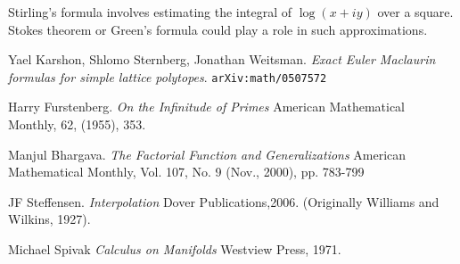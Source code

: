 \documentclass[12pt]{article}
\begin{document}
{\noindent Stirling's formula involves estimating the integral of $\log (x + iy)$ over a square.  Stokes theorem or Green's formula could play a role in such approximations.



\begin{thebibliography}{9}
Yael Karshon, Shlomo Sternberg, Jonathan Weitsman.
\textit{Exact Euler Maclaurin formulas for simple lattice polytopes}.  \texttt{arXiv:math/0507572}
 
Harry Furstenberg.  \textit{On the Infinitude of Primes} American Mathematical Monthly, 62, (1955), 353.

Manjul Bhargava.  \textit{The Factorial Function and Generalizations} American Mathematical Monthly, Vol. 107, No. 9 (Nov., 2000), pp. 783-799
 
JF Steffensen. \textit{Interpolation} Dover Publications,2006.  (Originally Williams and Wilkins, 1927).

Michael Spivak \textit{Calculus on Manifolds} Westview Press, 1971.

\end{thebibliography}
}
\end{document}
